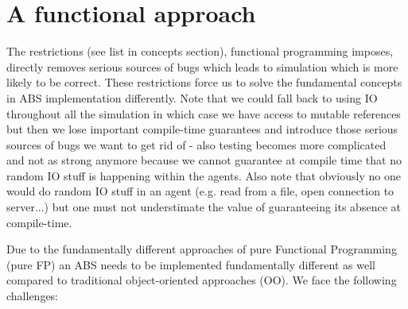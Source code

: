\section{A functional approach}
The restrictions (see list in concepts section), functional programming imposes, directly removes serious sources of bugs which leads to simulation which is more likely to be correct. These restrictions force us to solve the fundamental concepts in ABS implementation differently. Note that we could fall back to using IO throughout all the simulation in which case we have access to mutable references but then we lose important compile-time guarantees and introduce those serious sources of bugs we want to get rid of - also testing becomes more complicated and not as strong anymore because we cannot guarantee at compile time that no random IO stuff is happening within the agents. Also note that obviously no one would do random IO stuff in an agent (e.g. read from a file, open connection to server...) but one must not understimate the value of guaranteeing its absence at compile-time.

Due to the fundamentally different approaches of pure Functional Programming (pure FP) an ABS needs to be implemented fundamentally different as well compared to traditional object-oriented approaches (OO). We face the following challenges:

